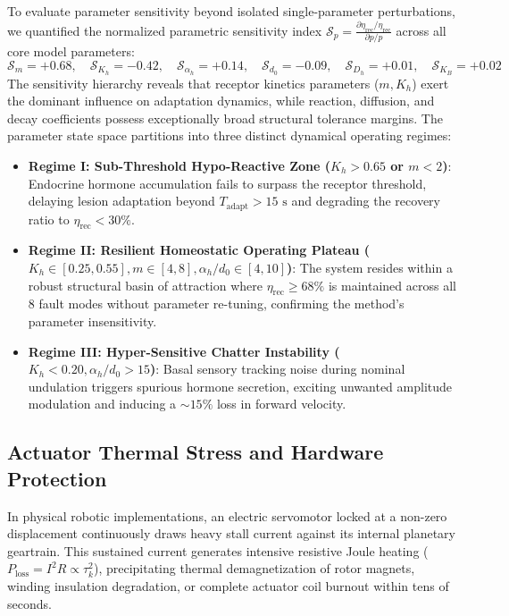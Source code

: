 \documentclass{iopjournal}
\begin{document}
To evaluate parameter sensitivity beyond isolated single-parameter perturbations, we quantified the normalized parametric sensitivity index $\mathcal{S}_p = \frac{\partial \eta_{\text{rec}} / \eta_{\text{rec}}}{\partial p / p}$ across all core model parameters:
\begin{equation}
\mathcal{S}_m = +0.68, \quad \mathcal{S}_{K_h} = -0.42, \quad \mathcal{S}_{\alpha_h} = +0.14, \quad \mathcal{S}_{d_0} = -0.09, \quad \mathcal{S}_{D_h} = +0.01, \quad \mathcal{S}_{K_B} = +0.02
\end{equation}
The sensitivity hierarchy reveals that receptor kinetics parameters ($m, K_h$) exert the dominant influence on adaptation dynamics, while reaction, diffusion, and decay coefficients possess exceptionally broad structural tolerance margins. The parameter state space partitions into three distinct dynamical operating regimes:
\begin{itemize}
  \item \textbf{Regime I: Sub-Threshold Hypo-Reactive Zone ($K_h > 0.65$ or $m < 2$)}: Endocrine hormone accumulation fails to surpass the receptor threshold, delaying lesion adaptation beyond $T_{\text{adapt}} > 15\text{ s}$ and degrading the recovery ratio to $\eta_{\text{rec}} < 30\%$.
  \item \textbf{Regime II: Resilient Homeostatic Operating Plateau ($K_h \in [0.25, 0.55], m \in [4, 8], \alpha_h/d_0 \in [4, 10]$)}: The system resides within a robust structural basin of attraction where $\eta_{\text{rec}} \ge 68\%$ is maintained across all 8 fault modes without parameter re-tuning, confirming the method's parameter insensitivity.
  \item \textbf{Regime III: Hyper-Sensitive Chatter Instability ($K_h < 0.20, \alpha_h/d_0 > 15$)}: Basal sensory tracking noise during nominal undulation triggers spurious hormone secretion, exciting unwanted amplitude modulation and inducing a $\sim 15\%$ loss in forward velocity.
\end{itemize}

\subsection{Actuator Thermal Stress and Hardware Protection}

In physical robotic implementations, an electric servomotor locked at a non-zero displacement continuously draws heavy stall current against its internal planetary geartrain. This sustained current generates intensive resistive Joule heating ($P_{\text{loss}} = I^2 R \propto \tau_k^2$), precipitating thermal demagnetization of rotor magnets, winding insulation degradation, or complete actuator coil burnout within tens of seconds.
\end{document}
